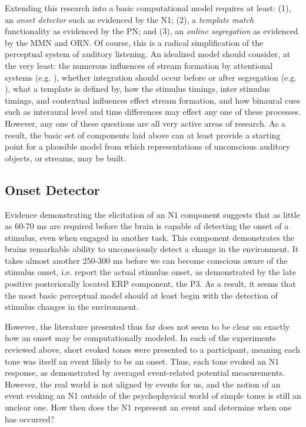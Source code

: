 \documentclass[a4paper,10pt,final]{ThesisStyle}
\begin{document}
Extending this research into a basic computational model requires at least: (1), an \textit{onset detector} such as evidenced by the N1; (2), a \textit{template match} functionality as evidenced by the PN; and (3), an \textit{online segregation} as evidenced by the MMN and ORN.  Of course, this is a radical simplification of the perceptual system of auditory listening.   An idealized model should consider, at the very least: the numerous influences of stream formation by attentional systems (e.g. \cite{Shamma2011}), whether integration should occur before or after segregation (e.g. \cite{Sussman2005}), what a template is defined by, how the stimulus timings, inter stimulus timings, and contextual influences effect stream formation, and how binaural cues such as interaural level and time differences may effect any one of these processes.  However, any one of these questions are all very active areas of research.  As a result, the basic set of components laid above can at least provide a starting point for a plausible model from which representations of unconscious auditory objects, or streams, may be built.  

\subsection{Onset Detector}

Evidence demonstrating the elicitation of an N1 component suggests that as little as 60-70 ms are required before the brain is capable of detecting the onset of a stimulus, even when engaged in another task.  This component demonstrates the brains remarkable ability to unconsciously detect a change in the environment.  It takes almost another 250-300 ms before we can become conscious aware of the stimulus onset, i.e. report the actual stimulus onset, as demonstrated by the late positive posteriorally located ERP component, the P3.  As a result, it seems that the most basic perceptual model should at least begin with the detection of stimulus changes in the environment.  

However, the literature presented thus far does not seem to be clear on exactly how an onset may be computationally modeled.  In each of the experiments reviewed above, short evoked tones were presented to a participant, meaning each tone was itself an event likely to be an onset.  Thus, each tone evoked an N1 response, as demonstrated by averaged event-related potential measurements.  However, the real world is not aligned by events for us, and the notion of an event evoking an N1 outside of the psychophysical world of simple tones is still an unclear one.  How then does the N1 represent an event and determine when one has occurred? 
\end{document}
